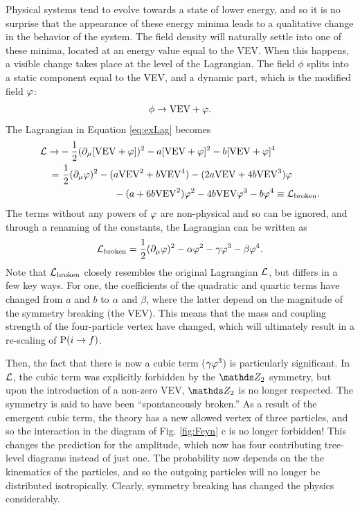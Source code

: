 Physical systems tend to evolve towards a state of lower energy, and so it is no surprise that the appearance of these energy minima leads to a qualitative change in the behavior of the system.  The field density will naturally settle into one of these minima, located at an energy value equal to the VEV. When this happens, a visible change takes place at the level of the Lagrangian. The field $\phi$ splits into a static component equal to the VEV, and a dynamic part, which is the modified field $\varphi$:
\begin{equation}
\phi \rightarrow {\rm VEV}+\varphi.
\end{equation}
The Lagrangian in Equation \ref{eq:exLag} becomes
\begin{align}
\begin{split}
\mathcal{L} \rightarrow& -\frac{1}{2}(\partial_\mu [{\rm VEV}+\varphi])^2  - a[{\rm VEV}+\varphi]^2 - b[{\rm VEV}+\varphi]^4\\
 = &\ \frac{1}{2}(\partial_\mu \varphi)^2 - (a {\rm VEV}^2 + b {\rm VEV}^4) - (2 a {\rm VEV} + 4 b {\rm VEV}^3) \varphi \\
& \ \ \ \ \ \ \ \ \ \ \ \ \ \ \ \ \  - (a + 6 b {\rm VEV}^2) \varphi^2 - 4 b {\rm VEV} \varphi^3 - b \varphi^4 
\equiv \mathcal{L}_{\rm broken}.
 \end{split}
\end{align}
The terms without any powers of $\varphi$ are non-physical and so can be ignored, and through a renaming of the constants, the Lagrangian can be written as
\begin{equation}
\mathcal{L}_{\rm broken} = \frac{1}{2}(\partial_\mu \varphi)^2 - \alpha \varphi^2 - \gamma \varphi^3 - \beta \varphi^4.
\end{equation}
Note that $\mathcal{L}_{\rm broken}$ closely resembles the original Lagrangian $\mathcal{L}$, but differs in a few key ways. For one, the coefficients of the quadratic and quartic terms have changed from $a$ and $b$ to $\alpha$ and $\beta$, where the latter depend on the magnitude of the symmetry breaking (the VEV). This means that the mass and coupling strength of the four-particle vertex have changed, which will ultimately result in a re-scaling of ${\rm P}(i\rightarrow f)$. 

Then, the fact that there is now a cubic term ($\gamma \varphi^3$) is particularly significant. In $\mathcal{L}$, the cubic term was explicitly forbidden by the $\ztwo$ symmetry, but upon the introduction of a non-zero VEV, $\ztwo$ is no longer respected. The symmetry is said to have been ``spontaneously broken.''  As a result of the emergent cubic term, the theory has a new allowed vertex of three particles, and so the interaction in the diagram of Fig. \ref{fig:Feyn} c is no longer forbidden! This changes the prediction for the amplitude, which now has four contributing tree-level diagrams instead of just one. The probability now depends on the the kinematics of the particles, and so the outgoing particles will no longer be distributed isotropically. Clearly, symmetry breaking has changed the physics considerably.

